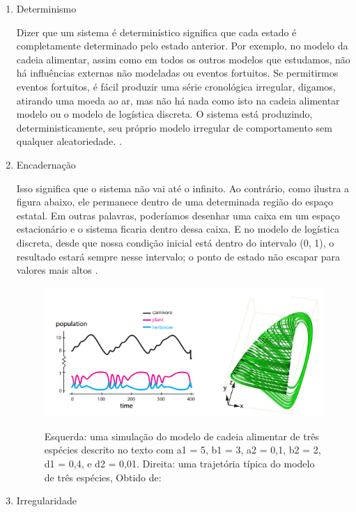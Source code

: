 \documentclass[11pt, letterpaper, portuguese]{article}
\begin{document}
    \begin{enumerate}
        \item Determinismo
    \par{Dizer que um sistema é determinístico significa que cada estado é completamente determinado pelo estado anterior. Por exemplo, no modelo da cadeia alimentar, assim como em todos os outros modelos que estudamos, não há influências externas não modeladas ou eventos fortuitos. Se permitirmos eventos fortuitos, é fácil produzir uma série cronológica irregular, digamos, atirando uma moeda ao ar, mas não há nada como isto na cadeia alimentar modelo ou o modelo de logística discreta. O sistema está produzindo, deterministicamente, seu próprio modelo irregular de comportamento sem qualquer aleatoriedade. \cite{garfinkel_shevtsov_guo_2017}.}

    \item{Encadernação}

    \par{Isso significa que o sistema não vai até o infinito. Ao contrário, como ilustra a figura abaixo, ele permanece dentro de uma determinada região do espaço estatal. Em outras palavras, poderíamos desenhar uma caixa em um espaço estacionário e o sistema ficaria dentro dessa caixa. E no modelo de logística discreta, desde que nossa condição inicial está dentro do intervalo (0, 1), o resultado estará sempre nesse intervalo; o ponto de estado não escapar para valores mais altos \cite{garfinkel_shevtsov_guo_2017}.}
    
    \begin{figure}[ht]
	    \centering
		\includegraphics[width=0.7 \textwidth]{Chaos.png}
		\label{Imagen_1}
		\caption{Esquerda: uma simulação do modelo de cadeia alimentar de três espécies descrito no texto com a1 = 5, b1 = 3, a2 = 0,1, b2 = 2, d1 = 0,4, e d2 = 0,01. Direita: uma trajetória típica do modelo de três espécies, Obtido de: \cite{garfinkel_shevtsov_guo_2017}}
	\end{figure}

	\item{Irregularidade}
	

\end{enumerate}
\end{document}
